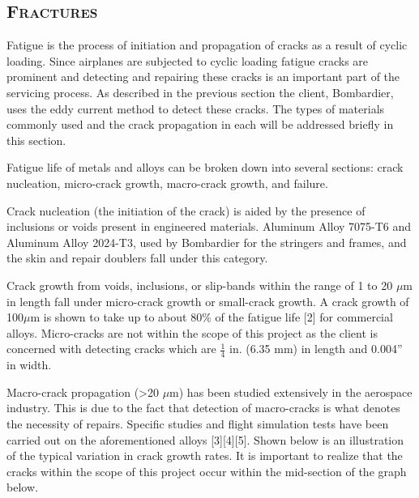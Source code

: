\documentclass[12pt]{article}
\begin{document}
\subsection{\textsc{Fractures}}\label{sec23}

Fatigue is the process of initiation and propagation of cracks as a result of cyclic loading. Since airplanes are subjected to cyclic loading fatigue cracks are prominent and detecting and repairing these cracks is an important part of the servicing process. As described in the previous section the client, Bombardier, uses the eddy current method to detect these cracks. The types of materials commonly used and the crack propagation in each will be addressed briefly in this section.

Fatigue life of metals and alloys can be broken down into several sections: crack nucleation, micro-crack growth, macro-crack growth, and failure. 

Crack nucleation (the initiation of the crack) is aided by the presence of inclusions or voids present in engineered materials. Aluminum Alloy 7075-T6 and Aluminum Alloy 2024-T3, used by Bombardier for the stringers and frames, and the skin and repair doublers fall under this category. 

Crack growth from voids, inclusions, or slip-bands within the range of 1 to 20 $\mu$m in length fall under micro-crack growth or small-crack growth. A crack growth of 100$\mu$m is shown to take up to about 80\% of the fatigue life [2] for commercial alloys. Micro-cracks are not within the scope of this project as the client is concerned with detecting cracks which are $\frac{1}{4}$ in. (6.35 mm) in length and 0.004'' in width.

Macro-crack propagation (>20 $\mu$m) has been studied extensively in the aerospace industry. This is due to the fact that detection of macro-cracks is what denotes the necessity of repairs. Specific studies and flight simulation tests have been carried out on the aforementioned alloys [3][4][5]. Shown below is an illustration of the typical variation in crack growth rates. It is important to realize that the cracks within the scope of this project occur within the mid-section of the graph below.
\end{document}
